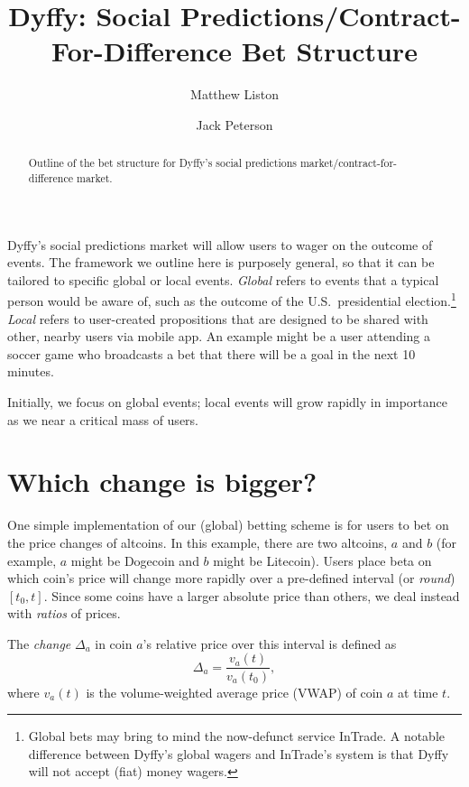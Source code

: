 \documentclass[floatfix,reprint,nofootinbib,amsmath,amssymb,epsfig,pre,floats,letterpaper,groupedaffiliation]{revtex4-1}
\newcommand{\beq}{\begin{equation}}
\newcommand{\eeq}{\end{equation}}
\begin{document}
\title{Dyffy: Social Predictions/Contract-For-Difference Bet Structure}

\author{Matthew Liston}
\author{Jack Peterson}

\begin{abstract}
Outline of the bet structure for Dyffy's social predictions market/contract-for-difference market.
\end{abstract}

\maketitle

Dyffy's social predictions market will allow users to wager on the outcome of events.  The framework we outline here is purposely general, so that it can be tailored to specific {global} or {local} events. \emph{Global} refers to events that a typical person would be aware of, such as the outcome of the U.S.~presidential election.\footnote{Global bets may bring to mind the now-defunct service InTrade.  A notable difference between Dyffy's global wagers and InTrade's system is that Dyffy will not accept (fiat) money wagers.}  \emph{Local} refers to user-created propositions that are designed to be shared with other, nearby users via mobile app.  An example might be a user attending a soccer game who broadcasts a bet that there will be a goal in the next 10 minutes.

Initially, we focus on global events; local events will grow rapidly in importance as we near a critical mass of users.

\section*{Which change is bigger?}

One simple implementation of our (global) betting scheme is for users to bet on the price changes of altcoins.  In this example, there are two altcoins, $a$ and $b$ (for example, $a$ might be Dogecoin and $b$ might be Litecoin).  Users place beta on which coin's price will change more rapidly over a pre-defined interval (or \emph{round}) $\left[t_0, t\right]$.  Since some coins have a larger absolute price than others, we deal instead with \emph{ratios} of prices.

The \emph{change} $\Delta_{a}$ in coin $a$'s relative price over this interval is defined as
\beq
\Delta_{a} = \frac{v_{a}(t)}{v_{a}(t_0)},
\eeq
where $v_{a}(t)$ is the volume-weighted average price (VWAP) of coin $a$ at time $t$.
\end{document}
